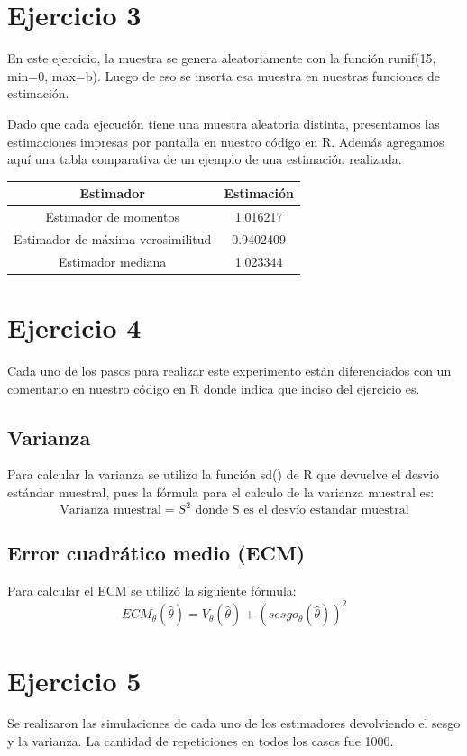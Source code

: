 \documentclass[a4paper]{article}
\begin{document}
\section{Ejercicio 3}
En este ejercicio, la muestra se genera aleatoriamente con la función runif(15, min=0, max=b). Luego de eso se inserta esa muestra en nuestras funciones de estimación. 

Dado que cada ejecución tiene una muestra aleatoria distinta, presentamos las estimaciones impresas por pantalla en nuestro código en R. Además agregamos aquí una tabla comparativa de un ejemplo de una estimación realizada. 

\begin{center}
 \begin{tabular}{||c | c||} 
 \hline
 Estimador & Estimación \\ [0.5ex] 
 \hline\hline
 Estimador de momentos & 1.016217 \\ 
 \hline
 Estimador de máxima verosimilitud & 0.9402409 \\
 \hline
 Estimador mediana & 1.023344 \\ [1ex] 
 \hline
\end{tabular}
\end{center}

\section{Ejercicio 4}
Cada uno de los pasos para realizar este experimento están diferenciados con un comentario en nuestro código en R donde indica que inciso del ejercicio es.
\subsection{Varianza}
Para calcular la varianza se utilizo la función sd() de R que devuelve el desvio estándar muestral, pues la fórmula para el calculo de la varianza muestral es:
\[
\textrm{Varianza muestral} = S^2 \textrm{ donde S es el desvío estandar muestral}
\]
\subsection{Error cuadrático medio (ECM)}
Para calcular el ECM se utilizó la siguiente fórmula:
\[
ECM_\theta(\hat{\theta}) = V_\theta(\hat{\theta}) + (sesgo_\theta(\hat{\theta}))^2
\]

\section{Ejercicio 5}
Se realizaron las simulaciones de cada uno de los estimadores devolviendo el sesgo y la varianza. La cantidad de repeticiones en todos los casos fue 1000.
\end{document}
